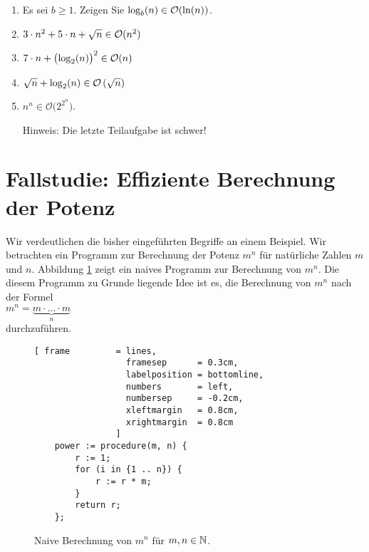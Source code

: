 \exercise
\begin{enumerate}
\item Es sei $b \geq 1$. Zeigen Sie $\log_{b}(n) \in \mathcal{O}(\ln(n))$.
\item $3 \cdot n^2 + 5 \cdot n + \sqrt{n} \in \mathcal{O}(n^2)$
\item $7 \cdot n + \bigl(\log_2(n)\bigr)^2 \in \mathcal{O}(n)$
\item $\sqrt{n} + \log_2(n) \in \mathcal{O}\left(\sqrt{n}\right)$
\item $n^n \in \mathcal{O}\bigl(2^{2^n}\bigr)$.

      Hinweis:  Die letzte Teilaufgabe ist schwer!
\end{enumerate}

\section{Fallstudie: Effiziente Berechnung der Potenz}
Wir  verdeutlichen die bisher eingef\"uhrten Begriffe an einem Beispiel.  Wir betrachten ein
Programm zur Berechnung der Potenz $m^n$ f\"ur nat\"urliche Zahlen $m$ und $n$.
Abbildung \ref{fig:power-naive.stlx} zeigt ein naives Programm zur Berechnung von $m^n$.
Die diesem Programm zu Grunde liegende Idee ist es, die Berechnung von $m^n$ 
nach der Formel \\[0.1cm]
\hspace*{1.3cm} 
$m^n = \underbrace{m \cdot {\dots} \cdot m}_n$ \\[0.1cm]
durchzuf\"uhren.  

\begin{figure}[!h]
  \centering
\begin{Verbatim}[ frame         = lines, 
                  framesep      = 0.3cm, 
                  labelposition = bottomline,
                  numbers       = left,
                  numbersep     = -0.2cm,
                  xleftmargin   = 0.8cm,
                  xrightmargin  = 0.8cm
                ]
    power := procedure(m, n) {
        r := 1;
        for (i in {1 .. n}) {
            r := r * m;
        }
        return r;
    };
\end{Verbatim}
\vspace*{-0.3cm}
  \caption{Naive Berechnung von $m^n$ f\"ur $m,n \in {\mathbb N}$.}
  \label{fig:power-naive.stlx}
\end{figure} 

